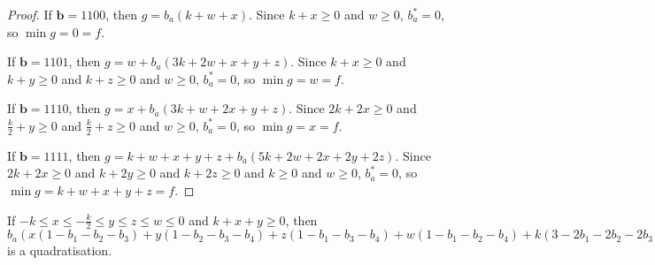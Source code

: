 \documentclass[11pt]{scrartcl}
\newcommand{\vc}[1]{\boldsymbol{#1}}
\begin{document}
\begin{proof}
If $\vc b = 1100$, then $g = b_a(k + w + x)$.
Since $k + x \ge 0$ and $w \ge 0$, $b_a^* = 0$, so $\min g = 0 = f$.

If $\vc b = 1101$, then $g = w + b_a(3k + 2w + x + y + z)$.
Since $k + x\ge 0 $ and $k + y \ge 0$ and $k + z \ge 0$ and $w \ge 0$, $b_a^* = 0$, so $\min g = w = f$.

If $\vc b = 1110$, then $g = x + b_a(3k + w + 2x + y + z)$.
Since $2k + 2x \ge 0$ and $\frac{k}{2} + y \ge 0$ and $\frac{k}{2} + z \ge 0$ and $w \ge 0$, $b_a^* = 0$, so $\min g = x = f$.

If $\vc b = 1111$, then $g = k + w + x + y + z + b_a(5k + 2w + 2x + 2y + 2z)$.
Since $2k + 2x \ge 0$ and $ k + 2y \ge 0$ and $k + 2z \ge 0$ and $k \ge 0$ and $w \ge 0$, $b_a^* = 0$, so $\min g = k + w + x + y + z = f$.

\end{proof}

\begin{lemma}
	If $-k\le x \le -\frac{k}{2} \le y \le z \le w \le 0$ and $k+x+y \ge 0$, then $b_a(x(1-b_1-b_2-b_3)+y(1-b_2-b_3-b_4)+z(1-b_1-b_3-b_4)+w(1-b_1-b_2-b_4)+k(3-2b_1-2b_2-2b_3-2b_4))+x(+b_1b_2+b_1b_3+b_2b_3)+y(+b_2b_3+b_2b_4+b_3b_4)+z(+b_1b_3+b_1b_4+b_3b_4)+w(+b_1b_2+b_1b_4+b_2b_4)+k(+b_1b_2+b_1b_3+b_1b_4+b_2b_3+b_2b_4+b_3b_4)$ is a quadratisation.\\
 \end{lemma}
\end{document}
